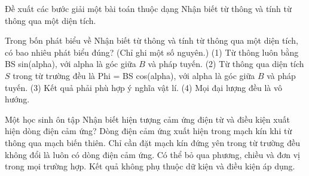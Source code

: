 \begin{bt}
Đề xuất các bước giải một bài toán thuộc dạng Nhận biết từ thông và tính từ thông qua một diện tích.
\end{bt}

\begin{ex}
Trong bốn phát biểu về Nhận biết từ thông và tính từ thông qua một diện tích, có bao nhiêu phát biểu đúng? (Chỉ ghi một số nguyên.) (1) Từ thông luôn bằng BS sin(alpha), với alpha là góc giữa $B$ và pháp tuyến. (2) Từ thông qua diện tích $S$ trong từ trường đều là Phi = BS cos(alpha), với alpha là góc giữa $B$ và pháp tuyến. (3) Kết quả phải phù hợp ý nghĩa vật lí. (4) Mọi đại lượng đều là vô hướng.
\end{ex}

\begin{ex}
Một học sinh ôn tập Nhận biết hiện tượng cảm ứng điện từ và điều kiện xuất hiện dòng điện cảm ứng?
\choice
{\True Dòng điện cảm ứng xuất hiện trong mạch kín khi từ thông qua mạch biến thiên.}
{Chỉ cần đặt mạch kín đứng yên trong từ trường đều không đổi là luôn có dòng điện cảm ứng.}
{Có thể bỏ qua phương, chiều và đơn vị trong mọi trường hợp.}
{Kết quả không phụ thuộc dữ kiện và điều kiện áp dụng.}
\end{ex}

